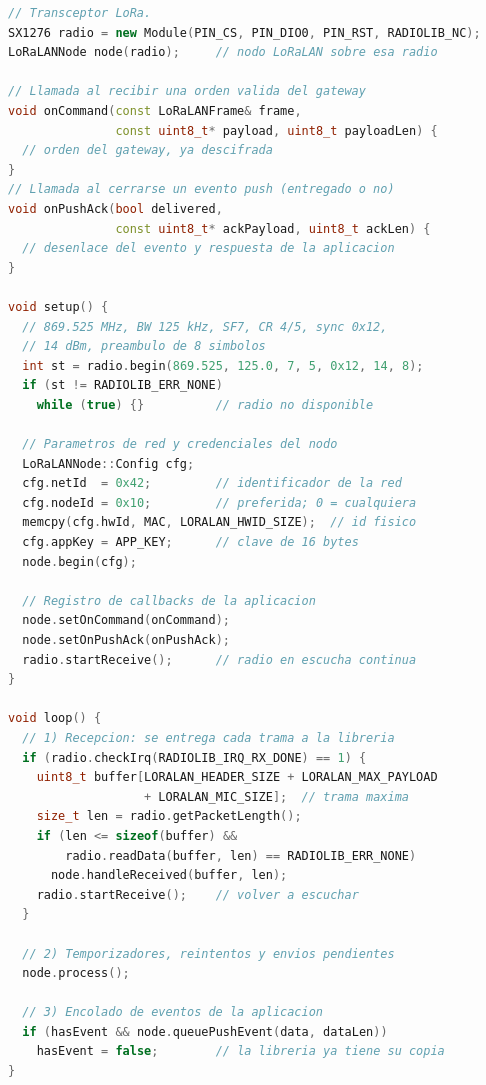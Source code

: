 \begin{lstlisting}[language=C++,basicstyle=\ttfamily\footnotesize,frame=single,breaklines=true,breakatwhitespace=true,caption={Ejemplo de implementación de un nodo LoRaLAN.},label={lst:nodo},captionpos=b]
// Transceptor LoRa.
SX1276 radio = new Module(PIN_CS, PIN_DIO0, PIN_RST, RADIOLIB_NC);
LoRaLANNode node(radio);     // nodo LoRaLAN sobre esa radio

// Llamada al recibir una orden valida del gateway
void onCommand(const LoRaLANFrame& frame,
               const uint8_t* payload, uint8_t payloadLen) {
  // orden del gateway, ya descifrada
}
// Llamada al cerrarse un evento push (entregado o no)
void onPushAck(bool delivered,
               const uint8_t* ackPayload, uint8_t ackLen) {
  // desenlace del evento y respuesta de la aplicacion
}

void setup() {
  // 869.525 MHz, BW 125 kHz, SF7, CR 4/5, sync 0x12,
  // 14 dBm, preambulo de 8 simbolos
  int st = radio.begin(869.525, 125.0, 7, 5, 0x12, 14, 8);
  if (st != RADIOLIB_ERR_NONE)
    while (true) {}          // radio no disponible

  // Parametros de red y credenciales del nodo
  LoRaLANNode::Config cfg;
  cfg.netId  = 0x42;         // identificador de la red
  cfg.nodeId = 0x10;         // preferida; 0 = cualquiera
  memcpy(cfg.hwId, MAC, LORALAN_HWID_SIZE);  // id fisico
  cfg.appKey = APP_KEY;      // clave de 16 bytes
  node.begin(cfg);

  // Registro de callbacks de la aplicacion
  node.setOnCommand(onCommand);
  node.setOnPushAck(onPushAck);
  radio.startReceive();      // radio en escucha continua
}

void loop() {
  // 1) Recepcion: se entrega cada trama a la libreria
  if (radio.checkIrq(RADIOLIB_IRQ_RX_DONE) == 1) {
    uint8_t buffer[LORALAN_HEADER_SIZE + LORALAN_MAX_PAYLOAD
                   + LORALAN_MIC_SIZE];  // trama maxima
    size_t len = radio.getPacketLength();
    if (len <= sizeof(buffer) &&
        radio.readData(buffer, len) == RADIOLIB_ERR_NONE)
      node.handleReceived(buffer, len);
    radio.startReceive();    // volver a escuchar
  }

  // 2) Temporizadores, reintentos y envios pendientes
  node.process();

  // 3) Encolado de eventos de la aplicacion
  if (hasEvent && node.queuePushEvent(data, dataLen))
    hasEvent = false;        // la libreria ya tiene su copia
}
\end{lstlisting}


